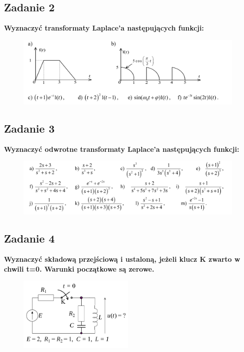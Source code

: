 \documentclass[12pt, a4paper]{article}
\begin{document}
\subsection{Zadanie 2}
\textbf{Wyznaczyć transformaty Laplace’a następujących funkcji:}
\begin{figure}[H]
  \centering
  \includegraphics[width = \textwidth]{./images/Lista_4/Zadanie_2.png}
\end{figure}

\subsection{Zadanie 3}
\textbf{Wyznaczyć odwrotne transformaty Laplace’a następujących funkcji:}
\begin{figure}[H]
  \centering
  \includegraphics[width = \textwidth]{./images/Lista_4/Zadanie_3.png}
\end{figure}

\subsection{Zadanie 4}
\textbf{Wyznaczyć składową przejściową i ustaloną, jeżeli klucz K zwarto w chwili t=0.
  Warunki początkowe są zerowe.}
\begin{figure}[H]
  \centering
  \includegraphics[width = 0.5\textwidth]{./images/Lista_4/Zadanie_4.png}
\end{figure}
\end{document}
